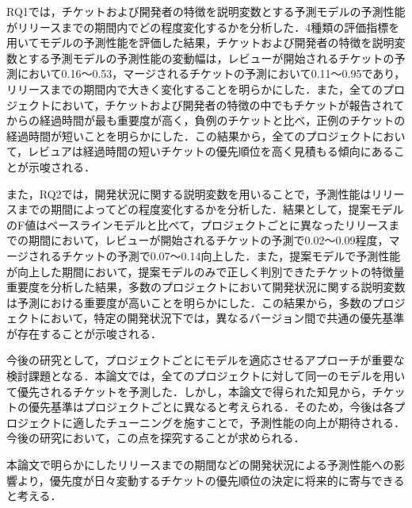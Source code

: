 \documentclass[submit]{ipsj}
\begin{document}
RQ1では，チケットおよび開発者の特徴を説明変数とする予測モデルの予測性能がリリースまでの期間内でどの程度変化するかを分析した．4種類の評価指標を用いてモデルの予測性能を評価した結果，チケットおよび開発者の特徴を説明変数とする予測モデルの予測性能の変動幅は，レビューが開始されるチケットの予測において0.16〜0.53，マージされるチケットの予測において0.11〜0.95であり，リリースまでの期間内で大きく変化することを明らかにした．また，全てのプロジェクトにおいて，チケットおよび開発者の特徴の中でもチケットが報告されてからの経過時間が最も重要度が高く，負例のチケットと比べ，正例のチケットの経過時間が短いことを明らかにした．この結果から，全てのプロジェクトにおいて，レビュアは経過時間の短いチケットの優先順位を高く見積もる傾向にあることが示唆される．

また，RQ2では，開発状況に関する説明変数を用いることで，予測性能はリリースまでの期間によってどの程度変化するかを分析した．結果として，提案モデルのF値はベースラインモデルと比べて，プロジェクトごとに異なったリリースまでの期間において，レビューが開始されるチケットの予測で0.02〜0.09程度，マージされるチケットの予測で0.07〜0.14向上した．また，提案モデルで予測性能が向上した期間において，提案モデルのみで正しく判別できたチケットの特徴量重要度を分析した結果，多数のプロジェクトにおいて開発状況に関する説明変数は予測における重要度が高いことを明らかにした．この結果から，多数のプロジェクトにおいて，特定の開発状況下では，異なるバージョン間で共通の優先基準が存在することが示唆される．

今後の研究として，プロジェクトごとにモデルを適応させるアプローチが重要な検討課題となる．本論文では，全てのプロジェクトに対して同一のモデルを用いて優先されるチケットを予測した．しかし，本論文で得られた知見から，チケットの優先基準はプロジェクトごとに異なると考えられる．そのため，今後は各プロジェクトに適したチューニングを施すことで，予測性能の向上が期待される．今後の研究において，この点を探究することが求められる．

本論文で明らかにしたリリースまでの期間などの開発状況による予測性能への影響より，優先度が日々変動するチケットの優先順位の決定に将来的に寄与できると考える．







\vspace{-4mm}

\begin{biography}
%
\end{biography}
\end{document}
